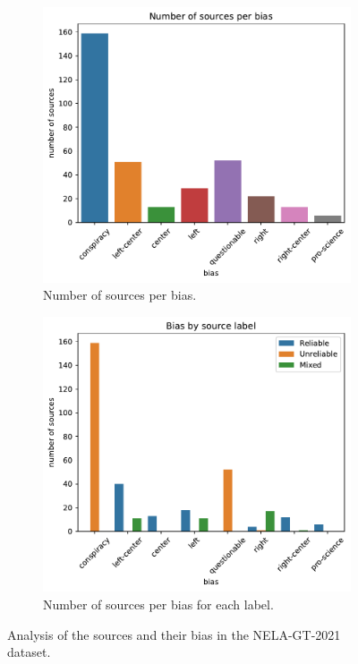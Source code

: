 \begin{figure}[H]
    \centering
    \begin{subfigure}{.5\textwidth}
      \centering
      \includegraphics[width=\linewidth]{obrazky-figures/bias_dist.pdf}
      \caption{Number of sources per bias.}
      \label{fig:bias_dist}
    \end{subfigure}%
    \begin{subfigure}{.5\textwidth}
      \centering
      \includegraphics[width=\linewidth]{obrazky-figures/bias_by_src.pdf}
      \caption{Number of sources per bias for each label.}
      \label{fig:bias_by_src}
    \end{subfigure}
    \caption{Analysis of the sources and their bias in the NELA-GT-2021 dataset.}
    \label{fig:test2}
\end{figure}

